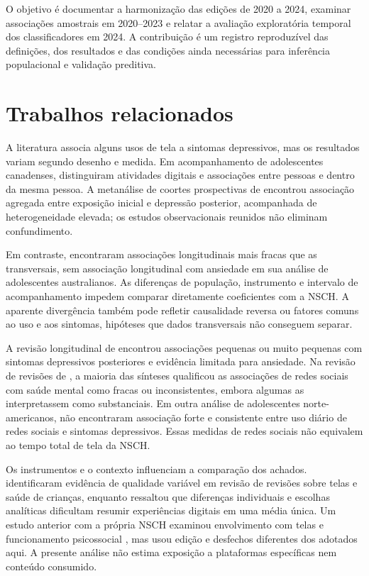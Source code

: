 ﻿\documentclass[12pt]{article}
\begin{document}
O objetivo é documentar a harmonização das edições de 2020 a 2024, examinar associações amostrais em 2020--2023 e relatar a avaliação exploratória temporal dos classificadores em 2024. A contribuição é um registro reproduzível das definições, dos resultados e das condições ainda necessárias para inferência populacional e validação preditiva. 
\section{Trabalhos relacionados}
A literatura associa alguns usos de tela a sintomas depressivos, mas os resultados variam segundo desenho e medida. Em acompanhamento de adolescentes canadenses, \cite{boers2019} distinguiram atividades digitais e associações entre pessoas e dentro da mesma pessoa. A metanálise de coortes prospectivas de \cite{gao2024} encontrou associação agregada entre exposição inicial e depressão posterior, acompanhada de heterogeneidade elevada; os estudos observacionais reunidos não eliminam confundimento.

Em contraste, \cite{li2025} encontraram associações longitudinais mais fracas que as transversais, sem associação longitudinal com ansiedade em sua análise de adolescentes australianos. As diferenças de população, instrumento e intervalo de acompanhamento impedem comparar diretamente coeficientes com a NSCH. A aparente divergência também pode refletir causalidade reversa ou fatores comuns ao uso e aos sintomas, hipóteses que dados transversais não conseguem separar.

A revisão longitudinal de \cite{tang2021} encontrou associações pequenas ou muito pequenas com sintomas depressivos posteriores e evidência limitada para ansiedade. Na revisão de revisões de \cite{valkenburg2022}, a maioria das sínteses qualificou as associações de redes sociais com saúde mental como fracas ou inconsistentes, embora algumas as interpretassem como substanciais. Em outra análise de adolescentes norte-americanos, \cite{kreski2021} não encontraram associação forte e consistente entre uso diário de redes sociais e sintomas depressivos. Essas medidas de redes sociais não equivalem ao tempo total de tela da NSCH.

Os instrumentos e o contexto influenciam a comparação dos achados. \cite{stiglic2019} identificaram evidência de qualidade variável em revisão de revisões sobre telas e saúde de crianças, enquanto \cite{orben2020} ressaltou que diferenças individuais e escolhas analíticas dificultam resumir experiências digitais em uma média única. Um estudo anterior com a própria NSCH examinou envolvimento com telas e funcionamento psicossocial \cite{przybylski2020}, mas usou edição e desfechos diferentes dos adotados aqui. A presente análise não estima exposição a plataformas específicas nem conteúdo consumido.
\end{document}
